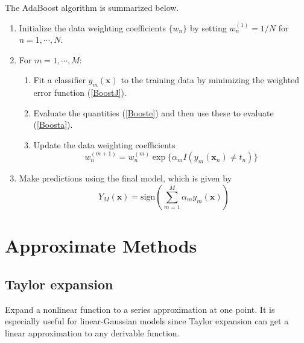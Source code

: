 \documentclass[a4paper]{report}
\newcommand{\up}{\mathrm}
\renewcommand{\bf}{\mathbf}
\begin{document}
The AdaBoost algorithm is summarized below.
\begin{enumerate}
	\item Initialize the data weighting coefficients $\{ w_n \}$ by setting $w_n^{(1)} = 1/N$ for $n = 1,\cdots,N$.
	\item For $m = 1,\cdots,M$:
		\begin{enumerate}
			\item Fit a classifier $y_m(\bf{x})$ to the training data by minimizing the weighted error function (\ref{BoostJ}).
			\item Evaluate the quantities (\ref{Booste}) and then use these to evaluate (\ref{Boosta}).
			\item Update the data weighting coefficients
			\begin{equation}
			w_n^{(m+1)} =	w_n^{(m)}\exp\{ \alpha_m I(y_m(\bf{x}_n)\neq t_n)\}
			\end{equation}
		\end{enumerate}
	\item Make predictions using the final model, which is given by
	\begin{equation}
		Y_M(\bf{x}) = \up{sign}\left( \sum_{m=1}^M \alpha_m y_m(\bf{x}) \right)
	\end{equation}
\end{enumerate}
\section{Approximate Methods}
\subsection{Taylor expansion}
Expand a nonlinear function to a series approximation at one point. It is especially useful for linear-Gaussian models since Taylor expansion can get a linear approximation to any derivable function.
\end{document}
